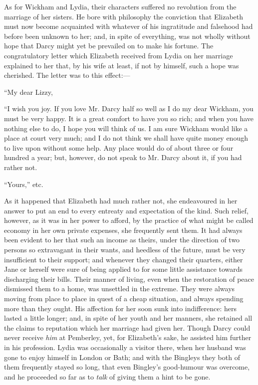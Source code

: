 \documentclass[12pt,openright]{book}
\begin{document}
As for Wickham and Lydia, their characters suffered no revolution from the marriage of her sisters. He bore with philosophy the conviction that Elizabeth must now become acquainted with whatever of his ingratitude and falsehood had before been unknown to her; and, in spite of everything, was not wholly without hope that Darcy might yet be prevailed on to make his fortune. The congratulatory letter which Elizabeth received from Lydia on her marriage explained to her that, by his wife at least, if not by himself, such a hope was cherished. The letter was to this effect:—

“My dear Lizzy,

“I wish you joy. If you love Mr. Darcy half so well as I do my dear Wickham, you must be very happy. It is a great comfort to have you so rich; and when you have nothing else to do, I hope you will think of us. I am sure Wickham would like a place at court very much; and I do not think we shall have quite money enough to live upon without some help. Any place would do of about three or four hundred a year; but, however, do not speak to Mr. Darcy about it, if you had rather not.

“Yours,” etc.


As it happened that Elizabeth had much rather not, she endeavoured in her answer to put an end to every entreaty and expectation of the kind. Such relief, however, as it was in her power to afford, by the practice of what might be called economy in her own private expenses, she frequently sent them. It had always been evident to her that such an income as theirs, under the direction of two persons so extravagant in their wants, and heedless of the future, must be very insufficient to their support; and whenever they changed their quarters, either Jane or herself were sure of being applied to for some little assistance towards discharging their bills. Their manner of living, even when the restoration of peace dismissed them to a home, was unsettled in the extreme. They were always moving from place to place in quest of a cheap situation, and always spending more than they ought. His affection for her soon sunk into indifference: hers lasted a little longer; and, in spite of her youth and her manners, she retained all the claims to reputation which her marriage had given her. Though Darcy could never receive \textit{him} at Pemberley, yet, for Elizabeth’s sake, he assisted him further in his profession. Lydia was occasionally a visitor there, when her husband was gone to enjoy himself in London or Bath; and with the Bingleys they both of them frequently stayed so long, that even Bingley’s good-humour was overcome, and he proceeded so far as to \textit{talk} of giving them a hint to be gone.
\end{document}

